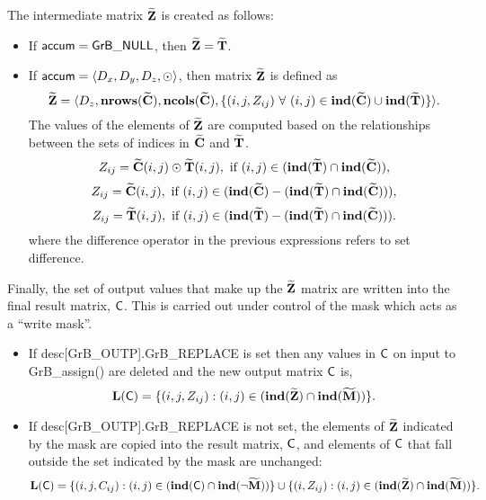 The intermediate matrix ${\bf \widetilde{Z}}$ is created as follows:
\begin{itemize}
    \item If ${\sf accum} = {\sf GrB\_NULL}$, then 
    ${\bf \widetilde{Z}} = {\bf \widetilde{T}}$.

    \item If ${\sf accum} = \langle D_x, D_y, D_z, \odot \rangle$, then matrix 
    ${\bf \widetilde{Z}}$ is defined as 
        \[ 
        {\bf \widetilde{Z}} = 
        \langle D_z, \bold{nrows}({\bf \widetilde{C}}),
        \bold{ncols}({\bf \widetilde{C}}), 
	    \{(i,j,Z_{ij}) \ \forall \ (i,j) \in \bold{ind}({\bf \widetilde{C}}) \cup 
        \bold{ind}({\bf \widetilde{T}}) \} \rangle.\]
    The values of the elements of ${\bf \widetilde{Z}}$ are computed based on 
    the relationships between the sets of indices in ${\bf \widetilde{C}}$ and 
    ${\bf \widetilde{T}}$.
\[
	Z_{ij} = {\bf \widetilde{C}}(i,j) \odot {\bf \widetilde{T}}(i,j), 
    \mbox{~if~} (i,j) \in  (\bold{ind}({\bf \widetilde{T}}) \cap 
    \bold{ind}({\bf \widetilde{C}})),
\]
\[
	Z_{ij} = {\bf \widetilde{C}}(i,j), \mbox{~if~} (i,j) \in  
    (\bold{ind}({\bf \widetilde{C}}) - (\bold{ind}({\bf \widetilde{T}}) \cap 
    \bold{ind}({\bf \widetilde{C}}))),
\]
\[
	Z_{ij} = {\bf \widetilde{T}}(i,j), \mbox{~if~} (i,j) \in  
    (\bold{ind}({\bf \widetilde{T}}) - (\bold{ind}({\bf \widetilde{T}}) \cap 
    \bold{ind}({\bf \widetilde{C}}))).
\]
where the difference operator in the previous expressions refers to set difference.
\end{itemize}

Finally, the set of output values that make up the ${\bf \widetilde{Z}}$ 
matrix are written into the final result matrix, ${\sf C}$. 
This is carried out under control of the mask which acts as a ``write mask''.
\begin{itemize}
\item If {\sf desc[GrB\_OUTP].GrB\_REPLACE} is set then any values in ${\sf C}$ 
on input to {\sf GrB\_assign()} are deleted and the new output matrix ${\sf C}$ is,
		\[ \bold{L}({\sf C}) = \{(i,j,Z_{ij}) : (i,j) \in (\bold{ind}({\bf \widetilde{Z}}) 
\cap \bold{ind}({\bf \widetilde{M}})) \}. \]

\item If {\sf desc[GrB\_OUTP].GrB\_REPLACE} is not set, the elements of 
${\bf \widetilde{Z}}$ indicated by 
the mask are copied into the result matrix, ${\sf C}$, and elements of 
${\sf C}$ that fall outside the set indicated by the mask are unchanged:
		\[ \bold{L}({\sf C}) = \{(i,j,C_{ij}) : (i,j) \in (\bold{ind}({\bf \sf C}) 
		\cap \bold{ind}(\neg {\bf \widetilde{M}})) \} \cup \{(i,Z_{ij}) : (i,j) \in 
(\bold{ind}({\bf \widetilde{Z}}) \cap \bold{ind}({\bf \widetilde{M}})) \}. \]
\end{itemize}

